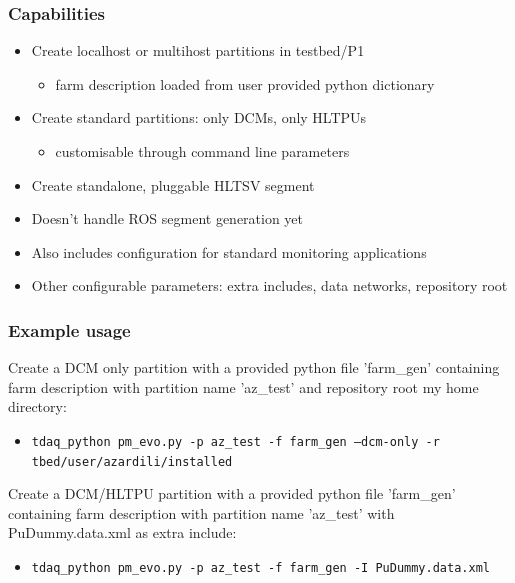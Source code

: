 \documentclass{beamer}
\begin{document}
\begin{frame}
 \frametitle{Capabilities}
 \begin{itemize}
   \item Create localhost or multihost partitions in testbed/P1
     \begin{itemize}
       \item farm description loaded from user provided python dictionary
     \end{itemize}
   \item Create standard partitions: only DCMs, only HLTPUs
     \begin{itemize}
       \item customisable through command line parameters
     \end{itemize}

   \item Create standalone, pluggable HLTSV segment
     
   \item Doesn't handle ROS segment generation yet

   \item Also includes configuration for standard monitoring applications
     
   \item Other configurable parameters: extra includes, data networks, repository root

 \end{itemize}
 
\end{frame}


\begin{frame}
  \frametitle{Example usage}
  Create a DCM only partition with a provided python file 'farm\_gen' containing farm
  description with partition name 'az\_test' and repository root my home directory:
  \begin{itemize}
    \item \texttt{tdaq\_python pm\_evo.py -p az\_test -f farm\_gen --dcm-only -r tbed/user/azardili/installed}

  \end{itemize}

    Create a DCM/HLTPU partition with a provided python file 'farm\_gen' containing farm
  description with partition name 'az\_test' with PuDummy.data.xml as extra include:
  \begin{itemize}
    \item \texttt{tdaq\_python pm\_evo.py -p az\_test -f farm\_gen -I PuDummy.data.xml}

  \end{itemize}
  


\end{frame}
\end{document}
